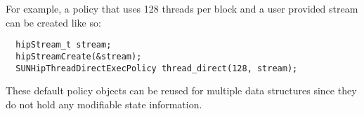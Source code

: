 For example, a policy that uses 128 threads per block and a user provided stream can be
created like so:

\begin{verbatim}
  hipStream_t stream;
  hipStreamCreate(&stream);
  SUNHipThreadDirectExecPolicy thread_direct(128, stream);
\end{verbatim}

These default policy objects can be reused for multiple {\sundials} data structures
since they do not hold any modifiable state information.
